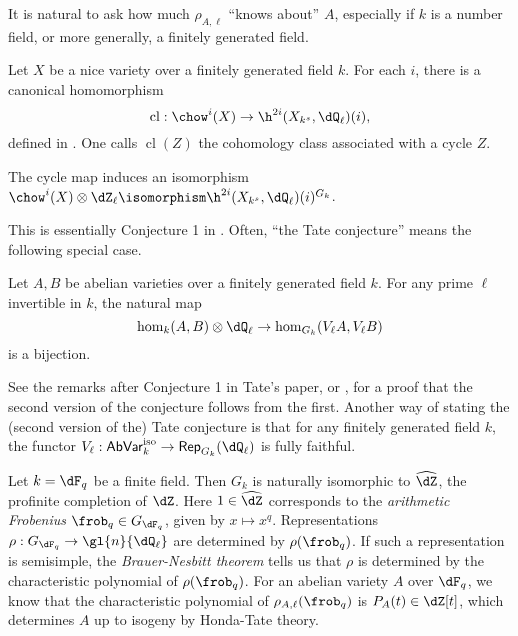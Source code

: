 It is natural to ask how much $\rho_{A,\ell}$ ``knows about'' $A$, especially 
if $k$ is a number field, or more generally, a finitely generated field. 

Let $X$ be a nice variety over a finitely generated field $k$. For each $i$, 
there is a canonical homomorphism 
\[
  \operatorname{cl}:\chow^i(X) \to \h^{2 i}(X_{k^s},\dQ_\ell)(i)\text{,}
\]
defined in \cite[VI 2.2.10]{de77}. One calls $\operatorname{cl}(Z)$ the 
cohomology class associated with a cycle $Z$. 

\begin{conjecture}[Tate]
The cycle map induces an isomorphism 
$\chow^i(X)\otimes\dZ_\ell \isomorphism \h^{2 i}(X_{k^s},\dQ_\ell)(i)^{G_k}$. 
\end{conjecture}

This is essentially Conjecture 1 in \cite{ta65}. Often, ``the Tate conjecture'' 
means the following special case. 

\begin{conjecture}[Tate]
Let $A,B$ be abelian varieties over a finitely generated field $k$. For any 
prime $\ell$ invertible in $k$, the natural map 
\[
  \hom_k(A,B)\otimes\dQ_\ell \to \hom_{G_k}(V_\ell A, V_\ell B) 
\]
is a bijection. 
\end{conjecture}

See the remarks after Conjecture 1 in Tate's paper, or 
\cite[IV.1.4]{fa84}, for a proof that the second version of the conjecture 
follows from the first. Another way of stating the (second version 
of the) Tate conjecture is that for any finitely generated field $k$, the 
functor $V_\ell:\mathsf{AbVar}_k^\text{iso} \to \mathsf{Rep}_{G_k}(\dQ_\ell)$ 
is fully faithful. 

\begin{example}
Let $k=\dF_q$ be a finite field. Then $G_k$ is naturally isomorphic to 
$\widehat\dZ$, the profinite completion of $\dZ$. Here $1\in \widehat\dZ$ 
corresponds to the \emph{arithmetic Frobenius} $\frob_q\in G_{\dF_q}$, given by 
$x\mapsto x^q$. Representations 
$\rho:G_{\dF_q} \to \gl{n}{\dQ_\ell}$ are determined by 
$\rho(\frob_q)$. If such a representation is semisimple, the 
\emph{Brauer-Nesbitt theorem} tells us that $\rho$ is determined by the 
characteristic polynomial of $\rho(\frob_q)$. For an abelian variety $A$ over 
$\dF_q$, we know that the characteristic polynomial of 
$\rho_{A,\ell}(\frob_q)$ is $P_A(t)\in \dZ[t]$, which determines $A$ up to 
isogeny by Honda-Tate theory. 
\end{example}

